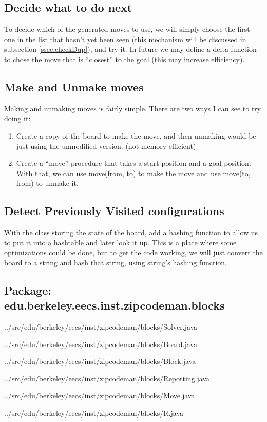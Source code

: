 \documentclass[a4paper]{article}
\newcommand{\sourceRoot}{../src/}
\newcommand{\myPackage}{}
\newcommand{\myJPackage}{}
\newcommand{\sourcePackage}[2]{  \subsection*{Package: #2}
                                 \renewcommand{\myPackage}{#1}
                                 \renewcommand{\myJPackage}{#2}}
\newcommand{\sourceClass}[1]{    
                                 {\sourceRoot\myPackage/#1}}
\begin{document}
\subsection{Decide what to do next}
To decide which of the generated moves to use, we will simply choose the first 
one in the list that hasn't yet been seen (this mechanism will be discussed in 
subsection \ref{ssec:checkDup}), and try it. In future we may define a delta 
function to chose the move that is ``closest'' to the goal (this may increase 
efficiency).

\subsection{Make and Unmake moves}
Making and unmaking moves is fairly simple. There are two ways I can see to try 
doing it: 
\begin{enumerate}
\item Create a copy of the board to make the move, and then unmaking would be 
      just using the unmodified version.  (not memory efficient)
\item Create a ``move'' procedure that takes a start position and a goal 
      position. With that, we can use move(from, to) to make the move and use 
      move(to, from) to unmake it. 
\end{enumerate}

\subsection{Detect Previously Visited configurations}
With the class storing the state of the board, add a hashing function to allow 
us to put it into a hashtable and later look it up. This is a place where some 
optimizations could be done, but to get the code working, we will just convert 
the board to a string and hash that string, using string's hashing function. 
\label{ssec:checkDup}


\sourcePackage{edu/berkeley/eecs/inst/zipcodeman/blocks}
		      {edu.berkeley.eecs.inst.zipcodeman.blocks}
\sourceClass{Solver.java}
\sourceClass{Board.java}
\sourceClass{Block.java}
\sourceClass{Reporting.java}
\sourceClass{Move.java}
\sourceClass{R.java}
\end{document}
